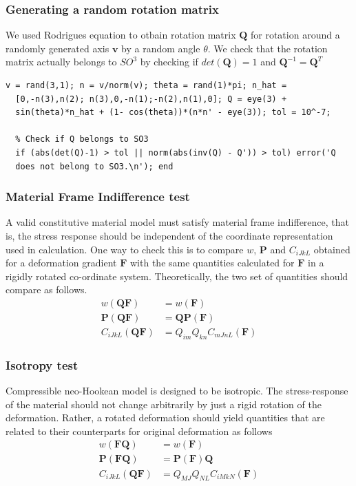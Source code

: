 \message{ !name(p1_2.tex)}\documentclass[../main.tex]{subfiles}
\begin{document}
\subsubsection{Generating a random rotation matrix}
We used Rodrigues equation to otbain rotation matrix $\mathbf{Q}$ for
rotation around a randomly generated axis $\mathbf{v}$ by a random
angle $\theta$. We check that the rotation matrix actually belongs to
$SO^3$ by checking if $det(\mathbf{Q}) = 1$ and
$\mathbf{Q}^{-1} =\mathbf{Q}^T $
\begin{lstlisting}[style = Matlab-editor]
  v = rand(3,1); n = v/norm(v); theta = rand(1)*pi; n_hat =
  [0,-n(3),n(2); n(3),0,-n(1);-n(2),n(1),0]; Q = eye(3) +
  sin(theta)*n_hat + (1- cos(theta))*(n*n' - eye(3)); tol = 10^-7;

  % Check if Q belongs to SO3
  if (abs(det(Q)-1) > tol || norm(abs(inv(Q) - Q')) > tol) error('Q
  does not belong to SO3.\n'); end
\end{lstlisting}

\subsubsection{Material Frame Indifference test}
\label{sec:mfi}
A valid constitutive material model must satisfy material frame
indifference, that is, the stress response should be independent of
the coordinate representation used in calculation. One way to check
this is to compare $w$, $\mathbf{P}$ and $C_{iJkL}$ obtained for a
deformation gradient $\mathbf{F}$ with the same quantities calculated
for $\mathbf{F}$ in a rigidly rotated co-ordinate
system. Theoretically, the two set of quantities should compare as
follows.
\begin{align*}
  w(\mathbf{QF}) &= w(\mathbf{F})\\
  \mathbf{P}(\mathbf{QF}) &= \mathbf{Q}\mathbf{P}(\mathbf{F})\\
  C_{iJkL}(\mathbf{QF}) &= Q_{im}Q_{kn}C_{mJnL}(\mathbf{F})
\end{align*}

\subsubsection{Isotropy test}
\label{sec:isotropy}
Compressible neo-Hookean model is designed to be isotropic. The
stress-response of the material should not change arbitrarily by just
a rigid rotation of the deformation. Rather, a rotated deformation
should yield quantities that are related to their counterparts for
original deformation as follows
\begin{align*}
  w(\mathbf{FQ}) &= w(\mathbf{F})\\
  \mathbf{P}(\mathbf{FQ}) &= \mathbf{P}(\mathbf{F})\mathbf{Q}\\
  C_{iJkL}(\mathbf{QF}) &= Q_{MJ}Q_{NL}C_{iMkN}(\mathbf{F})
\end{align*}
\end{document}

